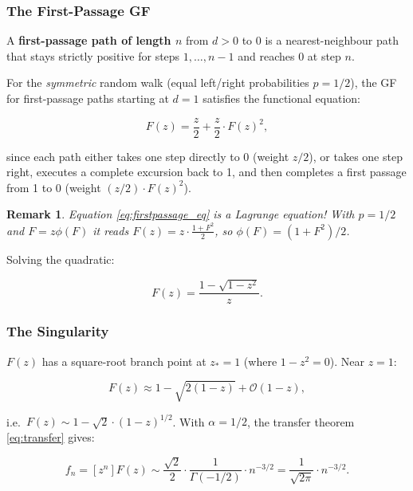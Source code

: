 \documentclass[11pt,a4paper]{article}
\newtheorem*{remark}{Remark}
\theoremstyle{definition}
\begin{document}
\subsubsection{The First-Passage GF}

A \textbf{first-passage path of length $n$} from $d > 0$ to 0 is a nearest-neighbour
path that stays strictly positive for steps $1, \ldots, n-1$ and reaches 0 at step $n$.

For the \emph{symmetric} random walk (equal left/right probabilities $p = 1/2$),
the GF for first-passage paths starting at $d = 1$ satisfies the functional equation:

\begin{equation}
  F(z) = \frac{z}{2} + \frac{z}{2}\cdot F(z)^2,
  \label{eq:firstpassage_eq}
\end{equation}

since each path either takes one step directly to 0 (weight $z/2$), or takes one
step right, executes a complete excursion back to 1, and then completes a first
passage from 1 to 0 (weight $(z/2)\cdot F(z)^2$).

\begin{remark}
Equation \eqref{eq:firstpassage_eq} is a Lagrange equation! With $p=1/2$ and
$F = z\phi(F)$ it reads $F(z) = z \cdot \frac{1+F^2}{2}$, so $\phi(F) = (1+F^2)/2$.
\end{remark}

Solving the quadratic:

\begin{equation}
  F(z) = \frac{1 - \sqrt{1 - z^2}}{z}.
  \label{eq:firstpassage_soln}
\end{equation}

\subsubsection{The Singularity}

$F(z)$ has a square-root branch point at $z_* = 1$ (where $1 - z^2 = 0$). Near $z = 1$:

\begin{equation}
  F(z) \approx 1 - \sqrt{2(1-z)} + \mathcal{O}(1-z),
  \label{eq:fp_branch}
\end{equation}

i.e.\ $F(z) \sim 1 - \sqrt{2}\cdot(1-z)^{1/2}$. With $\alpha = 1/2$, the transfer
theorem \eqref{eq:transfer} gives:

\begin{equation}
  f_n = [z^n]F(z) \sim \frac{\sqrt{2}}{2}\cdot\frac{1}{\Gamma(-1/2)}\cdot n^{-3/2}
      = \frac{1}{\sqrt{2\pi}}\cdot n^{-3/2}.
  \label{eq:fp_asymp}
\end{equation}
\end{document}
